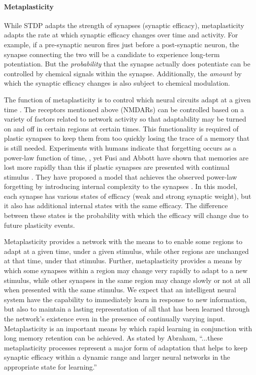 \paragraph{Metaplasticity}
While STDP adapts the strength of synapses (synaptic efficacy), metaplasticity adapts the rate at which synaptic efficacy changes over time and activity. For example, if a pre-synaptic neuron fires just before a post-synaptic neuron, the synapse connecting the two will be a candidate to experience long-term potentiation. But the \textit{probability} that the synapse actually does potentiate can be controlled by chemical signals within the synapse. Additionally, the \textit{amount} by which the synaptic efficacy changes is also subject to chemical modulation. 

The function of metaplasticity is to control which neural circuits adapt at a given time \cite{ab2008}. The receptors mentioned above (NMDARs) can be controlled based on a variety of factors related to network activity so that adaptability may be turned on and off in certain regions at certain times. This functionality is required of plastic synapses to keep them from too quickly losing the trace of a memory that is still needed. Experiments with humans indicate that forgetting occurs as a power-law function of time, \cite{wieb1991,wieb1997}, yet Fusi and Abbott have shown that memories are lost more rapidly than this if plastic synapses are presented with continual stimulus \cite{fuab2007}. They have proposed a model that achieves the observed power-law forgetting by introducing internal complexity to the synapses \cite{fudr2005}. In this model, each synapse has various states of efficacy (weak and strong synaptic weight), but it also has additional internal states with the same efficacy. The difference between these states is the probability with which the efficacy will change due to future plasticity events. 

Metaplasticity provides a network with the means to to enable some regions to adapt at a given time, under a given stimulus, while other regions are unchanged at that time, under that stimulus. Further, metaplasticity provides a means by which some synapses within a region may change very rapidly to adapt to a new stimulus, while other synapses in the same region may change slowly or not at all when presented with the same stimulus. We expect that an intelligent neural system have the capability to immediately learn in response to new information, but also to maintain a lasting representation of all that has been learned through the network's existence even in the presence of continually varying input. Metaplasticity is an important means by which rapid learning in conjunction with long memory retention can be achieved. As stated by Abraham, ``...these metaplasticity processes represent a major form of adaptation that helps to keep synaptic efficacy within a dynamic range and larger neural networks in the appropriate state for learning.''

